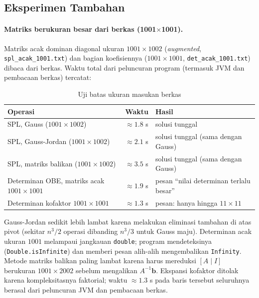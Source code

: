 \documentclass[12pt,a4paper]{article}
\begin{document}
\subsection{Eksperimen Tambahan}

\paragraph{Matriks berukuran besar dari berkas (1001$\times$1001).} Matriks acak dominan diagonal ukuran $1001\times1002$ (\textit{augmented}, \texttt{spl\_acak\_1001.txt}) dan bagian koefisiennya ($1001\times1001$, \texttt{det\_acak\_1001.txt}) dibaca dari berkas. Waktu total dari peluncuran program (termasuk JVM dan pembacaan berkas) tercatat:

\begin{table}[H]
\centering\small
\begin{tabular}{@{}lcl@{}}
\toprule
\textbf{Operasi} & \textbf{Waktu} & \textbf{Hasil}\\
\midrule
SPL, Gauss ($1001\times1002$) & $\approx1.8$ s & solusi tunggal\\
SPL, Gauss-Jordan ($1001\times1002$) & $\approx2.1$ s & solusi tunggal (sama dengan Gauss)\\
SPL, matriks balikan ($1001\times1002$) & $\approx3.5$ s & solusi tunggal (sama dengan Gauss)\\
Determinan OBE, matriks acak $1001\times1001$ & $\approx1.9$ s & pesan ``nilai determinan terlalu besar''\\
Determinan kofaktor $1001\times1001$ & $\approx1.3$ s & pesan: hanya hingga $11\times11$\\
\bottomrule
\end{tabular}
\caption{Uji batas ukuran masukan berkas}
\end{table}
Gauss-Jordan sedikit lebih lambat karena melakukan eliminasi tambahan di atas pivot (sekitar $n^3/2$ operasi dibanding $n^3/3$ untuk Gauss maju). Determinan acak ukuran $1001$ melampaui jangkauan \texttt{double}; program mendeteksinya (\texttt{Double.isInfinite}) dan memberi pesan alih-alih mengembalikan \texttt{Infinity}. Metode matriks balikan paling lambat karena harus mereduksi $[A\mid I]$ berukuran $1001\times2002$ sebelum mengalikan $A^{-1}\mathbf{b}$. Ekspansi kofaktor ditolak karena kompleksitasnya faktorial; waktu $\approx1.3$ s pada baris tersebut seluruhnya berasal dari peluncuran JVM dan pembacaan berkas.
\end{document}
